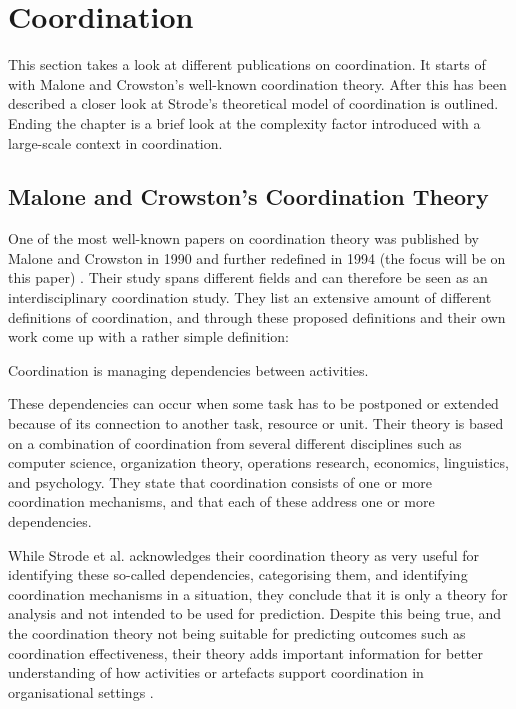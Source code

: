 \section{Coordination}

This section takes a look at different publications on coordination. It starts of with Malone and Crowston's well-known coordination theory. After this has been described a closer look at Strode's theoretical model of coordination is outlined. Ending the chapter is a brief look at the complexity factor introduced with a large-scale context in coordination.

\subsection{Malone and Crowston's Coordination Theory}

One of the most well-known papers on coordination theory was published by Malone and Crowston in 1990 and further redefined in 1994 (the focus will be on this paper) \cite{Malone1994}. Their study spans different fields and can therefore be seen as an interdisciplinary coordination study. They list an extensive amount of different definitions of coordination, and through these proposed definitions and their own work come up with a rather simple definition:

\begin{fancyquotes}
Coordination is managing dependencies between activities.
\end{fancyquotes}

These dependencies can occur when some task has to be postponed or extended because of its connection to another task, resource or unit. Their theory is based on a combination of coordination from several different disciplines such as computer science, organization theory, operations research, economics, linguistics, and psychology. They state that coordination consists of one or more coordination mechanisms, and that each of these address one or more dependencies.

While Strode et al. acknowledges their coordination theory as very useful for identifying these so-called dependencies, categorising them, and identifying coordination mechanisms in a situation, they conclude that it is only a theory for analysis and not intended to be used for prediction. Despite this being true, and the coordination theory not being suitable for predicting outcomes such as coordination effectiveness, their theory adds important information for better understanding of how activities or artefacts support coordination in organisational settings \cite{Strode2012}.

